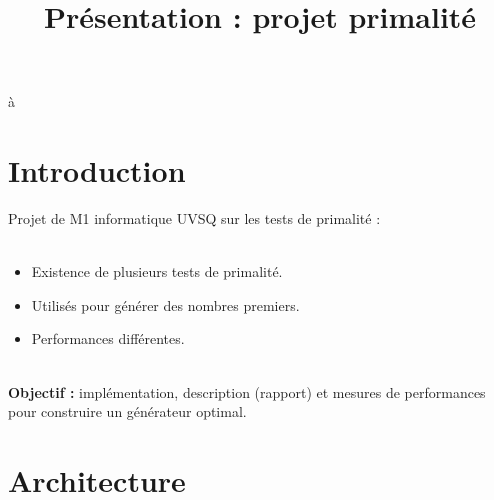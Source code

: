 
\usepackage[french,frenchkw,ruled,vlined]{../texLib/algorithm2e}
\usepackage{../texLib/myInfolines}
\usepackage{longtable,array}
\title{Présentation : projet primalité}




	\begin{frame}
		\titlepage
	\end{frame}
	à
	\section*{Introduction}
	
		\begin{frame}
			Projet de M1 informatique UVSQ sur les tests de primalité :\\~\\
			\begin{itemize}
				\item Existence de plusieurs tests de primalité.
				\item Utilisés pour générer des nombres premiers.
				\item Performances différentes.
			\end{itemize}~\\
			\pause
			\textbf{Objectif :} implémentation, description (rapport) et mesures de performances pour construire un générateur optimal.\\
		\end{frame}
	
		\begin{frame}
			\tableofcontents
		\end{frame}
		
	\section{Architecture}
	
